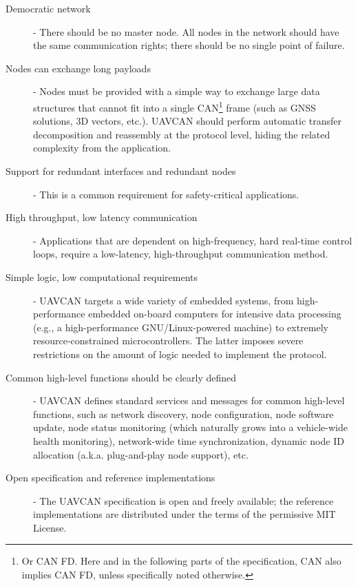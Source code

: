 \begin{description}
    \item[Democratic network] - There should be no master node.
    All nodes in the network should have the same communication rights; there should be no single point of failure.

    \item[Nodes can exchange long payloads] - Nodes must be provided with a simple way to exchange large
    data structures that cannot fit into a single CAN\footnote{Or CAN FD. Here and in the following parts of the
    specification, CAN also implies CAN FD, unless specifically noted otherwise.}
    frame (such as GNSS solutions, 3D vectors, etc.).
    UAVCAN should perform automatic transfer decomposition and reassembly at the protocol level,
    hiding the related complexity from the application.

    \item[Support for redundant interfaces and redundant nodes] - This is a common requirement for
    safety-critical applications.

    \item[High throughput, low latency communication] - Applications that are dependent on high-frequency,
    hard real-time control loops, require a low-latency, high-throughput communication method.

    \item[Simple logic, low computational requirements] - UAVCAN targets a wide variety of embedded systems,
    from high-performance embedded on-board computers for intensive data processing
    (e.g., a high-performance GNU/Linux-powered machine) to extremely resource-constrained microcontrollers.
    The latter imposes severe restrictions on the amount of logic needed to implement the protocol.

    \item[Common high-level functions should be clearly defined] - UAVCAN defines standard services
    and messages for common high-level functions, such as network discovery, node configuration,
    node software update, node status monitoring (which naturally grows into a vehicle-wide health monitoring),
    network-wide time synchronization, dynamic node ID allocation (a.k.a. plug-and-play node support), etc.

    \item[Open specification and reference implementations] - The UAVCAN specification is open and
    freely available; the reference implementations are distributed under the terms of the permissive MIT License.
\end{description}

